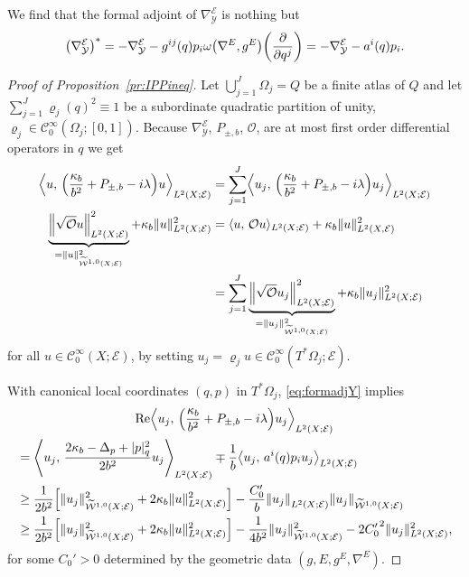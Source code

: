 \documentclass[AHL,Unicode,longabstracts]{cedram}
\newcommand{\clW}{\mathcal{W}}
\newcommand{\clC}{\mathcal{C}}
\newcommand{\clY}{\mathcal{Y}}
\newcommand{\clO}{\mathcal{O}}
\newcommand{\clE}{\mathcal{E}}
\DeclareMathOperator{\Ree}{Re}
\newcommand\norm[1]{\left\lVert#1\right\rVert}
\let\originalleft\left
\let\originalright\right
\renewcommand{\left}{\mathopen{}\mathclose\bgroup\originalleft}
\renewcommand{\right}{\aftergroup\egroup\originalright}
\begin{document}
We find that the formal adjoint of $\nabla_{\clY}^{\clE}$ is nothing but
\begin{equation}\label{eq:formadjY}
\left(\nabla^{\clE}_{\clY}\right)^{*}=-\nabla^{\clE}_{\clY}-g^{ij}(q)p_{i}\omega\left(\nabla^{E},g^{E}\right)\left(\frac{\partial}{\partial q^{j}}\right) =-\nabla^{\clE}_{\clY}-a^{i}(q)p_{i}.
\end{equation}
\begin{proof}[Proof of Proposition~\ref{pr:IPPineq}]
Let $\bigcup_{j=1}^{J}\Omega_{j}= Q$ be a finite atlas of $Q$ and let $\sum_{j=1}^{J}\varrho_{j}(q)^{2}\equiv 1$ be a subordinate quadratic partition of unity, $\varrho_{j}\in \clC^{\infty}_{0}(\Omega_{j};[0,1])$. Because $\nabla^{\clE}_{\clY}$, $P_{\pm,b}$, $\clO$, are at most first order differential operators in $q$ we get
\begin{align*}
\left\langle u,\, \left(\frac{\kappa_{b}}{b^{2}}+P_{\pm, b}-i\lambda\right)u\right\rangle_{L^{2}(X;\clE)} &=\sum_{j=1}^{J}\left\langle u_{j},\, \left(\frac{\kappa_{b}}{b^{2}}+P_{\pm, b}-i\lambda\right)u_{j}\right\rangle_{L^{2}(X;\clE)}
\\
\underbrace{\left\|\sqrt{\clO}u\right\|_{L^{2}(X;\clE)}^{2}}_{=\|u\|^{2}_{\widetilde{\clW}^{1,0}(X;\clE)}} + \kappa_{b}\|u\|_{L^{2}(X;\clE)}^{2} &=\langle u,\, \clO u\rangle_{L^{2}(X;\clE)}+\kappa_{b}\|u\|_{L^{2}(X,\clE)}^2
\\ &=\sum_{j=1}^{J}\underbrace{\left\|\sqrt{\clO}u_{j}\right\|_{L^{2}(X;\clE)}^{2}}_{=\|u_{j}\|^{2}_{\widetilde{\clW}^{1,0}(X;\clE)}}+ \kappa_{b} \|u_{j}\|_{L^{2}(X;\clE)}^{2}
\end{align*}
for all $u\in \clC^{\infty}_{0}(X;\clE)$, by setting $u_{j}=\varrho_{j}u\in \clC^{\infty}_{0}(T^{*}\Omega_{j};\clE)$.

With canonical local coordinates $(q,p)$ in $T^{*}\Omega_{j}$, \eqref{eq:formadjY} implies
\begin{multline*}
\Ree\left\langle u_{j},\, \left(\frac{\kappa_{b}}{b^{2}}+P_{\pm,b}-i\lambda\right)u_{j}\right\rangle_{L^{2}(X;\clE)}\\
\begin{aligned}
&=
\left\langle u_{j},\, \frac{2\kappa_{b}-\Delta_{p}+|p|_{q}^{2}}{2b^{2}}u_{j}\right\rangle_{L^{2}(X;\clE)}
\mp
\frac{1}{b}\left\langle u_{j},\, a^{i}(q)p_{i}u_{j}\right\rangle_{L^{2}(X;\clE)}
\\
&\geq \frac{1}{2b^{2}}\left[\|u_{j}\|_{\widetilde{\clW}^{1,0}(X;\clE)}^{2}+2\kappa_{b}\|u\|^{2}_{L^{2}(X;\clE)}\right]-\frac{C_{0}'}{b}\norm{u_{j}}_{L^{2}(X;\clE)}
\|u_{j}\|_{\widetilde{\clW}^{1,0}(X;\clE)}
\\ &\geq
\frac{1}{2b^{2}}\left[\|u_{j}\|_{\widetilde{\clW}^{1,0}(X;\clE)}^{2}+2\kappa_{b}\|u\|^{2}_{L^{2}(X;\clE)}\right]
-\frac{1}{4b^{2}}\|u_{j}\|_{\widetilde{\clW}^{1,0}(X;\clE)}^{2} -2{C_{0}'}^{2}\|u_{j}\|_{L^{2}(X;\clE)}^{2},
\end{aligned}
\end{multline*}
for some $C_{0}'>0$ determined by the geometric data $(g,E,g^{E},\nabla^{E})$.


\end{proof}
\end{document}
